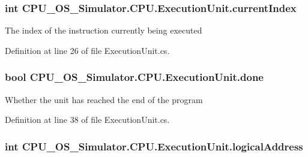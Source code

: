 \subsubsection[{current\+Index}]{\setlength{\rightskip}{0pt plus 5cm}int C\+P\+U\+\_\+\+O\+S\+\_\+\+Simulator.\+C\+P\+U.\+Execution\+Unit.\+current\+Index\hspace{0.3cm}{\ttfamily [private]}}\label{class_c_p_u___o_s___simulator_1_1_c_p_u_1_1_execution_unit_af6807cb5343acc2c40a08166c748f1f0}


The index of the instruction currently being executed 



Definition at line 26 of file Execution\+Unit.\+cs.

\hypertarget{class_c_p_u___o_s___simulator_1_1_c_p_u_1_1_execution_unit_aa62cb66691fd4d782a4fa5c70843da6e}{}
\subsubsection[{done}]{\setlength{\rightskip}{0pt plus 5cm}bool C\+P\+U\+\_\+\+O\+S\+\_\+\+Simulator.\+C\+P\+U.\+Execution\+Unit.\+done\hspace{0.3cm}{\ttfamily [private]}}\label{class_c_p_u___o_s___simulator_1_1_c_p_u_1_1_execution_unit_aa62cb66691fd4d782a4fa5c70843da6e}


Whether the unit has reached the end of the program 



Definition at line 38 of file Execution\+Unit.\+cs.

\hypertarget{class_c_p_u___o_s___simulator_1_1_c_p_u_1_1_execution_unit_aa387f2bbbf0de1c75cbd1c79e27a630c}{}
\subsubsection[{logical\+Address}]{\setlength{\rightskip}{0pt plus 5cm}int C\+P\+U\+\_\+\+O\+S\+\_\+\+Simulator.\+C\+P\+U.\+Execution\+Unit.\+logical\+Address\hspace{0.3cm}{\ttfamily [private]}}\label{class_c_p_u___o_s___simulator_1_1_c_p_u_1_1_execution_unit_aa387f2bbbf0de1c75cbd1c79e27a630c}


